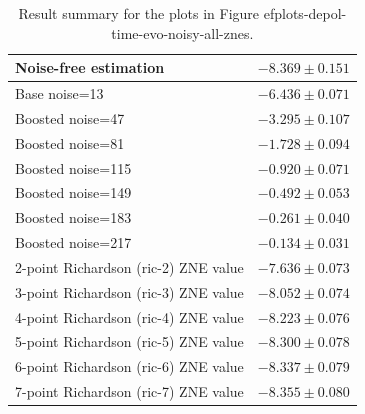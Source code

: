 \begin{table}
\caption{Result summary for the plots in Figure 
ef{plots-depol-time-evo-noisy-all-znes}.}
\begin{tabular*}{\textwidth}{@{\extracolsep{\fill}}ll@{}}
\toprule

Noise-free estimation & $-8.369 \pm 0.151$ \\
\midrule
Base noise=13 & $-6.436 \pm 0.071$ \\
Boosted noise=47 & $-3.295 \pm 0.107$ \\
Boosted noise=81 & $-1.728 \pm 0.094$ \\
Boosted noise=115 & $-0.920 \pm 0.071$ \\
Boosted noise=149 & $-0.492 \pm 0.053$ \\
Boosted noise=183 & $-0.261 \pm 0.040$ \\
Boosted noise=217 & $-0.134 \pm 0.031$ \\
\midrule
2-point Richardson (ric-2) ZNE value & $-7.636 \pm 0.073$ \\
3-point Richardson (ric-3) ZNE value & $-8.052 \pm 0.074$ \\
4-point Richardson (ric-4) ZNE value & $-8.223 \pm 0.076$ \\
5-point Richardson (ric-5) ZNE value & $-8.300 \pm 0.078$ \\
6-point Richardson (ric-6) ZNE value & $-8.337 \pm 0.079$ \\
7-point Richardson (ric-7) ZNE value & $-8.355 \pm 0.080$ \\
\bottomrule
\end{tabular*}
\label{table-depol-noise-free-time-evo}
\end{table}
